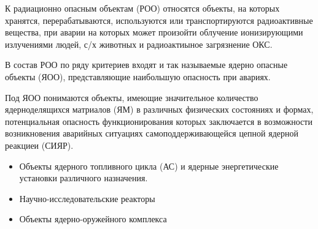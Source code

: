 \documentclass[a4paper, 12pt]{article}
\theoremstyle{definition}
\begin{document}
        К радиационно опасным объектам (РОО) относятся объекты, на которых хранятся, перерабатываются, используются или транспортируются радиоактивные вещества, при аварии на которых может произойти облучение ионизирующими излучениями людей, с/х животных и радиоактиыное загрязнение ОКС.

        В состав РОО по ряду критериев входят и так называемые ядерно опасные объекты (ЯОО), представляющие наибольшую опасность при авариях.

        Под ЯОО понимаются объекты, имеющие значительное количество ядерноделящихся матриалов (ЯМ) в различных физических состояниях и формах, потенциальная опасность функционирования которых заключается в возможности возникновения аварийных ситуациях самоподдерживающейся цепной ядерной реакциеи (СИЯР).
        \begin{itemize}
            \item Объекты ядерного топливного цикла (АС) и ядерные энергетические установки различного назначения.
            \item Научно-исследовательские реакторы
            \item Объекты ядерно-оружейного комплекса
        \end{itemize} 
\end{document}
